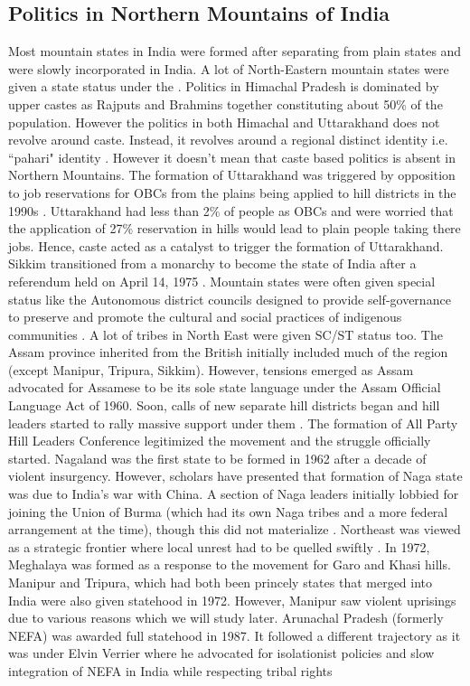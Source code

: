 \subsection{Politics in Northern Mountains of India}

Most mountain states in India were formed after separating from plain states and were slowly incorporated in India. A lot of North-Eastern mountain states were given a state status under the \cite{North_eastern_reorg_1971}.  Politics in Himachal Pradesh is dominated by upper castes as  Rajputs and Brahmins together constituting about 50\% of the population. However the politics in both Himachal and Uttarakhand does not revolve around caste. Instead, it revolves around a regional distinct identity i.e. ``pahari" identity \citep{mishra2000politics}. However it doesn't mean that caste based politics is absent in Northern Mountains. The formation of Uttarakhand was triggered by opposition to job reservations for OBCs from the plains being applied to hill districts in the 1990s \citep{mishra2000politics}. Uttarakhand had less than 2\% of people as OBCs and were worried that the application of 27\% reservation in hills would lead to plain people taking there jobs. Hence, caste acted as a catalyst to trigger the formation of Uttarakhand.  Sikkim transitioned from a monarchy to become the  state of India after a referendum held on April 14, 1975 \citep{code1979volume}. Mountain states were often given special status like the Autonomous district councils  designed to provide self-governance to preserve and promote the cultural and social practices of indigenous communities \citep{pautunthang2024india}. A lot of tribes in North East were given SC/ST status too. The Assam province inherited from the British initially included much of the region (except Manipur, Tripura, Sikkim). However, tensions emerged as Assam advocated for Assamese to be its sole state language under the Assam Official Language Act of 1960. Soon, calls of new separate hill districts began and hill leaders started to rally massive support under them \citep{inoue2005integration}. The formation of All Party Hill Leaders Conference legitimized the movement and the struggle officially started. Nagaland was the first state to be formed in 1962 after a decade of violent insurgency. However, scholars have presented that formation of Naga state was due to India's war with China.  A section of Naga leaders initially lobbied for joining the Union of Burma (which had its own Naga tribes and a more federal arrangement at the time), though this did not materialize \citep{Wouters_2023}. Northeast was viewed as a strategic frontier where local unrest had to be quelled swiftly \citep{johari1975creation}. In 1972, Meghalaya was formed as a response to the movement for Garo and Khasi hills. Manipur and Tripura, which had both been princely states that merged into India were also given statehood in 1972. However, Manipur saw violent uprisings due to various reasons which we will study later. Arunachal Pradesh (formerly NEFA) was awarded full statehood in 1987. It followed a different trajectory as it was under Elvin Verrier where he advocated for isolationist policies and slow integration of NEFA in India while respecting tribal rights 